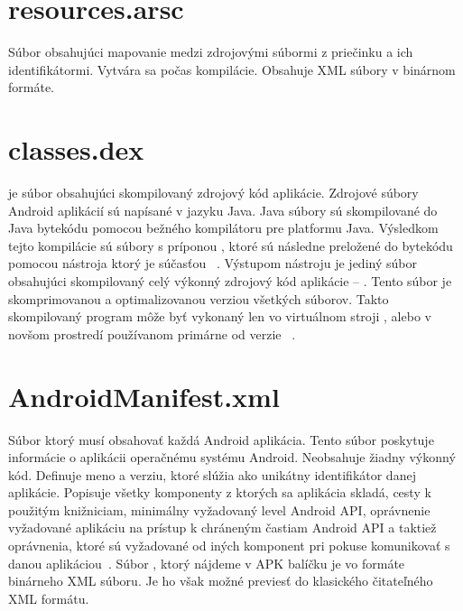 \section{resources.arsc}
\label{resources.arsc}
Súbor obsahujúci mapovanie medzi zdrojovými súbormi  z priečinku  a ich identifikátormi.  Vytvára sa počas kompilácie. Obsahuje XML súbory v binárnom formáte.

\section{classes.dex}
\label{classes.dex}
 je súbor obsahujúci skompilovaný zdrojový kód aplikácie.  Zdrojové súbory Android aplikácií sú napísané v jazyku Java. Java súbory sú skompilované do Java bytekódu pomocou bežného kompilátoru pre platformu Java. Výsledkom tejto kompilácie sú súbory s príponou , ktoré sú následne preložené do  bytekódu pomocou nástroja  ktorý je súčasťou ~\cite{Reddy2014}. Výstupom nástroju  je jediný súbor obsahujúci skompilovaný celý výkonný zdrojový kód aplikácie -- . Tento súbor je skomprimovanou a optimalizovanou verziou všetkých  súborov. Takto skompilovaný program môže byť vykonaný len vo virtuálnom stroji , alebo v novšom prostredí  používanom primárne od verzie ~\cite{dalvik}.

\section{AndroidManifest.xml} 
\label{AndroidManifest.xml}
Súbor ktorý musí obsahovať každá Android aplikácia. Tento súbor poskytuje informácie o aplikácii operačnému systému Android. Neobsahuje žiadny výkonný kód. Definuje meno a verziu, ktoré slúžia ako unikátny identifikátor danej aplikácie. Popisuje všetky komponenty z ktorých sa aplikácia skladá, cesty k použitým knižniciam, minimálny vyžadovaný level Android API, oprávnenie vyžadované aplikáciu na prístup k chráneným častiam Android API a taktiež oprávnenia, ktoré sú vyžadované od iných komponent pri pokuse komunikovať s danou aplikáciou~\cite{appManifest}. Súbor , ktorý nájdeme v APK balíčku je vo formáte binárneho XML súboru. Je ho však možné previesť do klasického čitateľného XML formátu.


